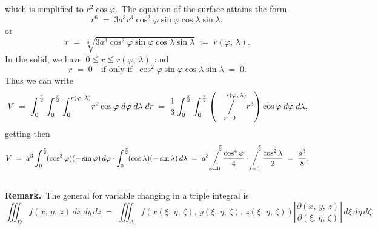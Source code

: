 \documentclass[12pt]{article}
\newcommand{\sijoitus}[2]%
{\operatornamewithlimits{\Big/}_{\!\!\!#1}^{\,#2}}
\begin{document}
which is simplified to $r^2\cos\varphi$.\, The equation of the surface attains the form
$$r^6 \;=\; 3a^3r^3\cos^2\varphi\sin\varphi\cos\lambda\sin\lambda,$$
or
$$r \;=\; \sqrt[3]{3a^3\cos^2\varphi\sin\varphi\cos\lambda\sin\lambda} \;:=\; r(\varphi,\,\lambda).$$
In the solid, we have\, $0 \leqq r \leqq r(\varphi,\,\lambda)$\, and
$$r \;=\; 0 \quad \mbox{if only if}\;\; \cos^2\varphi\sin\varphi\cos\lambda\sin\lambda \;=\; 0.$$
Thus we can write
$$V \;=\; \int_0^{\frac{\pi}{2}}\int_0^{\frac{\pi}{2}}\int_0^{r(\varphi,\,\lambda)}\!r^2\cos\varphi\;d\varphi\;d\lambda\;dr
\;=\; 
\frac{1}{3}\int_0^{\frac{\pi}{2}}\int_0^{\frac{\pi}{2}}\left(\sijoitus{r=0}{\quad r(\varphi,\,\lambda)}\!r^3\right)\cos\varphi\;d\varphi\;d\lambda,$$
getting then
$$V \;=\; 
a^3\int_0^{\frac{\pi}{2}}\!(\cos^3\varphi)(-\sin\varphi)\,d\varphi
\cdot\int_0^{\frac{\pi}{2}}\!(\cos\lambda)(-\sin\lambda)\,d\lambda
\;=\; a^3\!\sijoitus{\varphi=0}{\quad\frac{\pi}{2}}\!\frac{\cos^4\varphi}{4}
\cdot\!\sijoitus{\lambda=0}{\quad\frac{\pi}{2}}\!\frac{\cos^2\lambda}{2} \;=\; \frac{a^3}{8}.$$\\


\textbf{Remark.}\, The general  for variable changing in a triple integral is
$$\iiint_Df(x,\,y,\,z)\,dx\,dy\,dz \:=\; 
\iiint_\Delta\!f(x(\xi,\,\eta,\,\zeta),\,y(\xi,\,\eta,\,\zeta),\,z(\xi,\,\eta,\,\zeta))
\left|\frac{\partial(x,\,y,\,z)}{\partial(\xi,\,\eta,\,\zeta)}\right|\,d\xi\,d\eta\,d\zeta.$$



\end{document}
